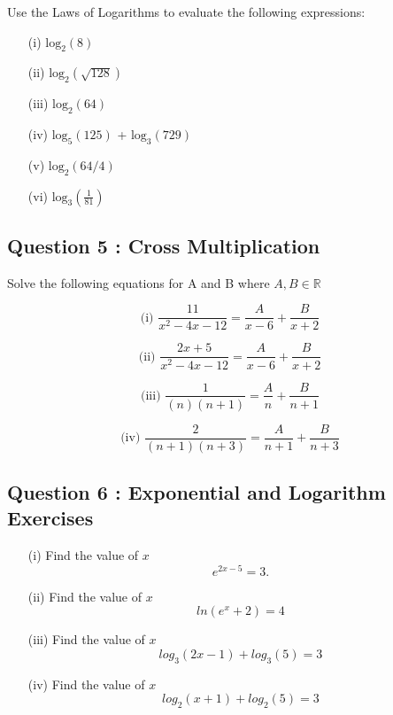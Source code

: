 \documentclass[]{article}
\begin{document}
\bigskip
\large
\noindent Use the Laws of Logarithms to evaluate the following expressions:

	\begin{multicols}{2}
		\begin{itemize}
		\item[(i)] $\mbox{log}_2(8)$
		\item[(ii)] $\mbox{log}_2(\sqrt{128})$
		\item[(iii)] $\mbox{log}_2(64)$
		\item[(iv)] $\mbox{log}_5(125)$ +   $\mbox{log}_3(729)$
		\item[(v)] $\mbox{log}_2(64/4)$
		\item[(vi)] $\mbox{log}_3(\frac{1}{81})$
				\end{itemize}
		\end{multicols}
	\subsection*{Question 5 : Cross Multiplication}
	Solve the following equations for A and B where $A,B \in \mathbb{R}$
	\begin{multicols}{2}
	\[ \mbox{(i)     } \frac{11}{x^2 - 4x - 12} = \frac{A}{x-6} + \frac{B}{x+2}\]
	
	\[ \mbox{(ii)    }\frac{2x + 5}{x^2 - 4x - 12} = \frac{A}{x-6} + \frac{B}{x+2}\]
	
	\[ \mbox{(iii)     }  \frac{1}{(n)(n+1)} = \frac{A}{n} + \frac{B}{n+1}\]
	
	\[ \mbox{(iv)    }\frac{2}{(n+1)(n+3)} = \frac{A}{n+1} + \frac{B}{n+3}\]
	\end{multicols}
\subsection*{Question 6 : Exponential and Logarithm Exercises}

\begin{multicols}{2}
\begin{itemize}
	\item[(i)] Find the value of $x$
	\[e^{2x-5} = 3. \]
		
	\item[(ii)] Find the value of $x$
	\[ln(e^x+2) = 4\]
	
	\item[(iii)] Find the value of $x$
	\[log_3(2x - 1) + log_3(5) = 3\]
	
	\item[(iv)] Find the value of $x$
	\[log_2(x + 1) + log_2(5) = 3\]
\end{itemize}
\end{multicols}
\end{document}
